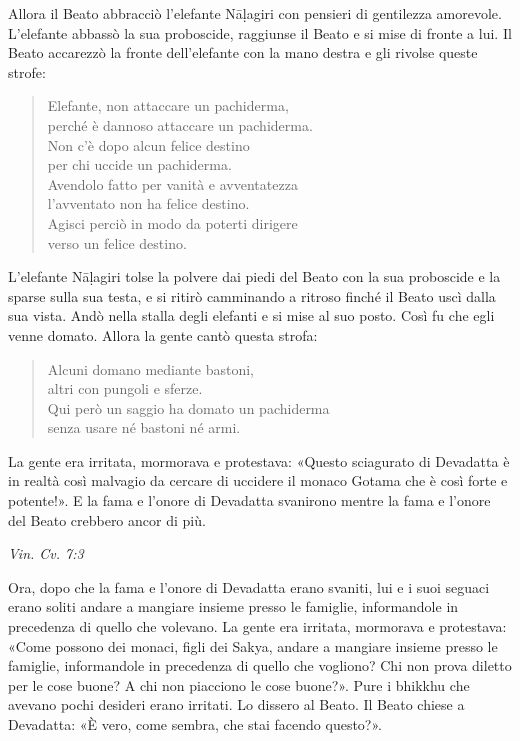 Allora il Beato abbracciò l’elefante Nāḷagiri con pensieri di gentilezza
amorevole. L’elefante abbassò la sua proboscide, raggiunse il Beato e si
mise di fronte a lui. Il Beato accarezzò la fronte dell’elefante con la
mano destra e gli rivolse queste strofe:


\begin{quote}
Elefante, non attaccare un pachiderma, \\
perché è dannoso attaccare un pachiderma. \\
Non c’è dopo alcun felice destino \\
per chi uccide un pachiderma. \\
Avendolo fatto per vanità e avventatezza \\
l’avventato non ha felice destino. \\
Agisci perciò in modo da poterti dirigere \\
verso un felice destino.
\end{quote}

L’elefante Nāḷagiri tolse la polvere dai piedi del Beato con la sua
proboscide e la sparse sulla sua testa, e si ritirò camminando a ritroso
finché il Beato uscì dalla sua vista. Andò nella stalla degli elefanti e
si mise al suo posto. Così fu che egli venne domato. Allora la gente
cantò questa strofa:


\begin{quote}
Alcuni domano mediante bastoni, \\
altri con pungoli e sferze. \\
Qui però un saggio ha domato un pachiderma \\
senza usare né bastoni né armi.
\end{quote}

La gente era irritata, mormorava e protestava: «Questo sciagurato di
Devadatta è in realtà così malvagio da cercare di uccidere il monaco
Gotama che è così forte e potente!». E la fama e l’onore di Devadatta
svanirono mentre la fama e l’onore del Beato crebbero ancor di più.


\emph{Vin. Cv. 7:3}


Ora, dopo che la fama e l’onore di Devadatta erano svaniti, lui e i suoi
seguaci erano soliti andare a mangiare insieme presso le famiglie,
informandole in precedenza di quello che volevano. La gente era
irritata, mormorava e protestava: «Come possono dei monaci, figli dei
Sakya, andare a mangiare insieme presso le famiglie, informandole in
precedenza di quello che vogliono? Chi non prova diletto per le cose
buone? A chi non piacciono le cose buone?». Pure i bhikkhu che avevano
pochi desideri erano irritati. Lo dissero al Beato. Il Beato chiese a
Devadatta: «È vero, come sembra, che stai facendo questo?».


